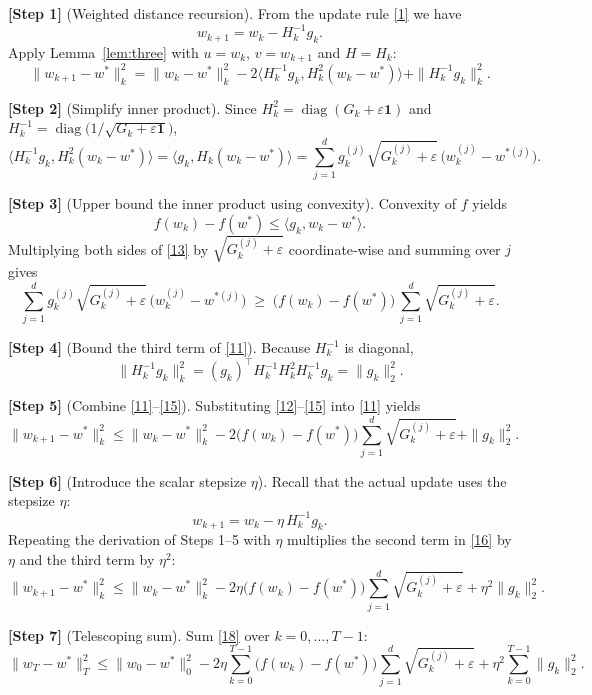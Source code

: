 \documentclass{article}
\newcommand{\ip}[2]{\langle #1,#2\rangle}
\begin{document}
\noindent\textbf{[Step 1]} (Weighted distance recursion).  
From the update rule \eqref{1} we have
\[
w_{k+1}= w_{k}- H_{k}^{-1} g_{k}.
\tag{10}
\]
Apply Lemma~\ref{lem:three} with $u=w_{k}$, $v=w_{k+1}$ and $H=H_{k}$:
\[
\|w_{k+1}-w^{\ast}\|_{k}^{2}
= \|w_{k}-w^{\ast}\|_{k}^{2}
-2\ip{H_{k}^{-1}g_{k}}{H_{k}^{2}(w_{k}-w^{\ast})}
+ \|H_{k}^{-1}g_{k}\|_{k}^{2}.
\tag{11}
\]

\noindent\textbf{[Step 2]} (Simplify inner product).  
Since $H_{k}^{2}= \operatorname{diag}(G_{k}+\varepsilon\mathbf 1)$ and
$H_{k}^{-1}= \operatorname{diag}\bigl(1/\sqrt{G_{k}+\varepsilon\mathbf 1}\bigr)$,
\[
\ip{H_{k}^{-1}g_{k}}{H_{k}^{2}(w_{k}-w^{\ast})}
= \ip{g_{k}}{H_{k}(w_{k}-w^{\ast})}
= \sum_{j=1}^{d} g_{k}^{(j)}\sqrt{G_{k}^{(j)}+\varepsilon}\,
\bigl(w_{k}^{(j)}-w^{\ast (j)}\bigr).
\tag{12}
\]

\noindent\textbf{[Step 3]} (Upper bound the inner product using convexity).  
Convexity of $f$ yields
\[
f(w_{k})-f(w^{\ast})\le \ip{g_{k}}{w_{k}-w^{\ast}}.
\tag{13}
\]
Multiplying both sides of \eqref{13} by $\sqrt{G_{k}^{(j)}+\varepsilon}$
coordinate‑wise and summing over $j$ gives
\[
\sum_{j=1}^{d} g_{k}^{(j)}\sqrt{G_{k}^{(j)}+\varepsilon}\,
\bigl(w_{k}^{(j)}-w^{\ast (j)}\bigr)
\;\ge\;
\bigl(f(w_{k})-f(w^{\ast})\bigr)\,
\sum_{j=1}^{d}\sqrt{G_{k}^{(j)}+\varepsilon}.
\tag{14}
\]

\noindent\textbf{[Step 4]} (Bound the third term of \eqref{11}).  
Because $H_{k}^{-1}$ is diagonal,
\[
\|H_{k}^{-1}g_{k}\|_{k}^{2}
= (g_{k})^{\top} H_{k}^{-1} H_{k}^{2} H_{k}^{-1} g_{k}
= \|g_{k}\|_{2}^{2}.
\tag{15}
\]

\noindent\textbf{[Step 5]} (Combine \eqref{11}–\eqref{15}).  
Substituting \eqref{12}–\eqref{15} into \eqref{11} yields
\[
\|w_{k+1}-w^{\ast}\|_{k}^{2}
\le \|w_{k}-w^{\ast}\|_{k}^{2}
-2\bigl(f(w_{k})-f(w^{\ast})\bigr)
\sum_{j=1}^{d}\sqrt{G_{k}^{(j)}+\varepsilon}
+ \|g_{k}\|_{2}^{2}.
\tag{16}
\]

\noindent\textbf{[Step 6]} (Introduce the scalar stepsize $\eta$).  
Recall that the actual update uses the stepsize $\eta$:
\[
w_{k+1}= w_{k}-\eta\,H_{k}^{-1} g_{k}.
\tag{17}
\]
Repeating the derivation of Steps 1–5 with $\eta$ multiplies the
second term in \eqref{16} by $\eta$ and the third term by $\eta^{2}$:
\[
\|w_{k+1}-w^{\ast}\|_{k}^{2}
\le \|w_{k}-w^{\ast}\|_{k}^{2}
-2\eta\bigl(f(w_{k})-f(w^{\ast})\bigr)
\sum_{j=1}^{d}\sqrt{G_{k}^{(j)}+\varepsilon}
+ \eta^{2}\|g_{k}\|_{2}^{2}.
\tag{18}
\]

\noindent\textbf{[Step 7]} (Telescoping sum).  
Sum \eqref{18} over $k=0,\dots,T-1$:
\[
\|w_{T}-w^{\ast}\|_{T}^{2}
\le \|w_{0}-w^{\ast}\|_{0}^{2}
-2\eta\sum_{k=0}^{T-1}
\bigl(f(w_{k})-f(w^{\ast})\bigr)
\sum_{j=1}^{d}\sqrt{G_{k}^{(j)}+\varepsilon}
+ \eta^{2}\sum_{k=0}^{T-1}\|g_{k}\|_{2}^{2}.
\tag{19}
\]
\end{document}
